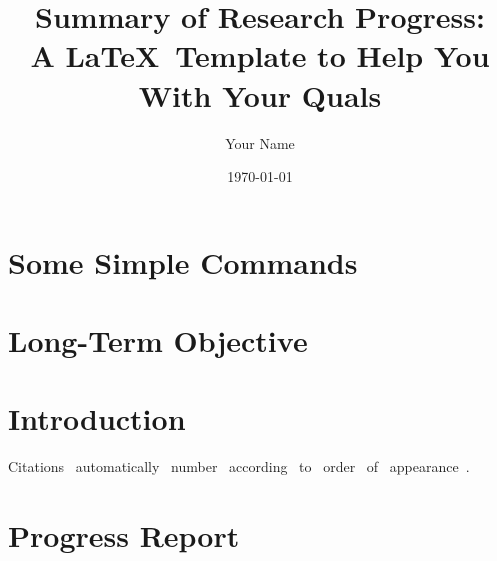 \documentclass{report}
\title{Summary of Research Progress:\\A \LaTeX\ Template to Help You With Your Quals}
\author{Your Name}
\date{\today}
\begin{document}
\maketitle


\thispagestyle{fancy}


\section{Some Simple Commands}



\section{Long-Term Objective}
\label{sec:objective}


\section{Introduction}
\label{sec:introduction}
Citations~\cite{youssef_scalable_2021} automatically~\cite{sood_coupling_2022} number~\cite{schuette_decorrelating_2023} according~\cite{schuette_applying_2020} to~\cite{youssef_scalable_2023} order~\cite{schuette_efficient_2023} of~\cite{zhang_topology_2015} appearance~\cite{zhang_shape_2016}.




\section{Progress Report}
\label{sec:progress_report}

\end{document}
